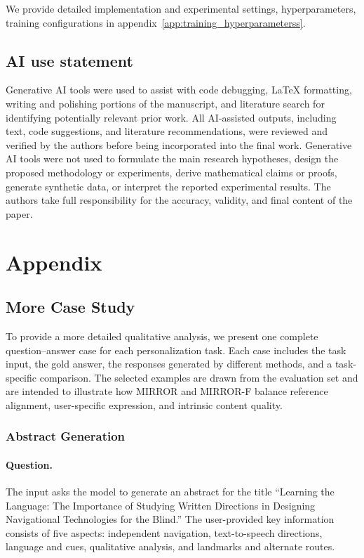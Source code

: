 \documentclass{article} %
\begin{document}
We provide detailed implementation and experimental settings, hyperparameters, training configurations in appendix~\ref{app:training_hyperparameterss}. 

\subsection*{AI use statement}
Generative AI tools were used to assist with code debugging, LaTeX formatting, writing and polishing portions of the manuscript, and literature search for identifying potentially relevant prior work. All AI-assisted outputs, including text, code suggestions, and literature recommendations, were reviewed and verified by the authors before being incorporated into the final work. Generative AI tools were not used to formulate the main research hypotheses, design the proposed methodology or experiments, derive mathematical claims or proofs, generate synthetic data, or interpret the reported experimental results. The authors take full responsibility for the accuracy, validity, and final content of the paper.




\appendix
\section{Appendix}
\subsection{More Case Study}
\label{app:more_case_study}

To provide a more detailed qualitative analysis, we present one complete question--answer case for each personalization task. Each case includes the task input, the gold answer, the responses generated by different methods, and a task-specific comparison. The selected examples are drawn from the evaluation set and are intended to illustrate how MIRROR and MIRROR-F balance reference alignment, user-specific expression, and intrinsic content quality.

\subsubsection{Abstract Generation}

\paragraph{Question.}
The input asks the model to generate an abstract for the title ``Learning the Language: The Importance of Studying Written Directions in Designing Navigational Technologies for the Blind.'' The user-provided key information consists of five aspects: independent navigation, text-to-speech directions, language and cues, qualitative analysis, and landmarks and alternate routes.
\end{document}
